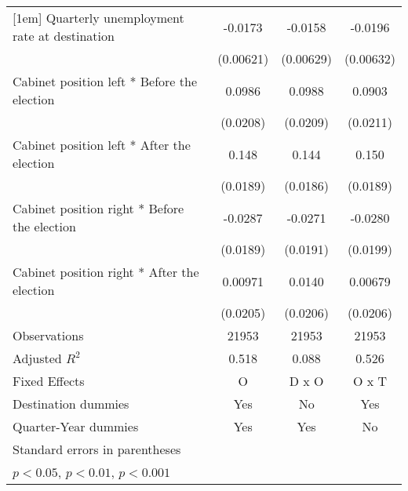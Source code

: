 \begin{table}[htbp]
\begin{tabular}{l*{3}{c}}
[1em]
Quarterly unemployment rate at destination&     -0.0173\sym{**} &     -0.0158\sym{*}  &     -0.0196\sym{**} \\
                    &   (0.00621)         &   (0.00629)         &   (0.00632)         \\
[1em]
Cabinet position left * Before the election&      0.0986\sym{***}&      0.0988\sym{***}&      0.0903\sym{***}\\
                    &    (0.0208)         &    (0.0209)         &    (0.0211)         \\
[1em]
Cabinet position left * After the election&       0.148\sym{***}&       0.144\sym{***}&       0.150\sym{***}\\
                    &    (0.0189)         &    (0.0186)         &    (0.0189)         \\
[1em]
Cabinet position right * Before the election&     -0.0287         &     -0.0271         &     -0.0280         \\
                    &    (0.0189)         &    (0.0191)         &    (0.0199)         \\
[1em]
Cabinet position right * After the election&     0.00971         &      0.0140         &     0.00679         \\
                    &    (0.0205)         &    (0.0206)         &    (0.0206)         \\
\hline
Observations        &       21953         &       21953         &       21953         \\
Adjusted \(R^{2}\)  &       0.518         &       0.088         &       0.526         \\
Fixed Effects       &           O         &       D x O         &       O x T         \\
Destination dummies &         Yes         &          No         &         Yes         \\
Quarter-Year dummies&         Yes         &         Yes         &          No         \\
\hline\hline
\multicolumn{4}{l}{\footnotesize Standard errors in parentheses}\\
\multicolumn{4}{l}{\footnotesize \sym{*} \(p<0.05\), \sym{**} \(p<0.01\), \sym{***} \(p<0.001\)}\\
\end{tabular}
\end{table}
